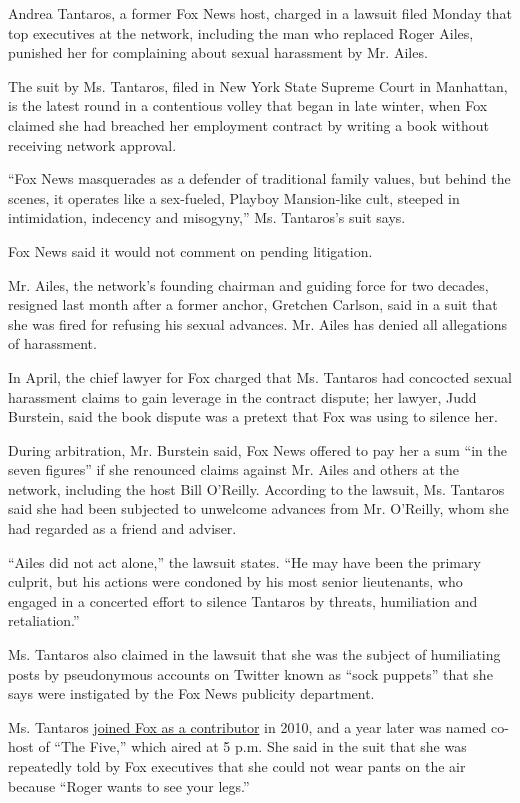 Andrea Tantaros, a former Fox News host, charged in a lawsuit filed
Monday that top executives at the network, including the man who
replaced Roger Ailes, punished her for complaining about sexual
harassment by Mr. Ailes.

The suit by Ms. Tantaros, filed in New York State Supreme Court in
Manhattan, is the latest round in a contentious volley that began in
late winter, when Fox claimed she had breached her employment contract
by writing a book without receiving network approval.

``Fox News masquerades as a defender of traditional family values, but
behind the scenes, it operates like a sex-fueled, Playboy Mansion-like
cult, steeped in intimidation, indecency and misogyny,'' Ms. Tantaros's
suit says.

Fox News said it would not comment on pending litigation.

Mr. Ailes, the network's founding chairman and guiding force for two
decades, resigned last month after a former anchor, Gretchen Carlson,
said in a suit that she was fired for refusing his sexual advances. Mr.
Ailes has denied all allegations of harassment.

In April, the chief lawyer for Fox charged that Ms. Tantaros had
concocted sexual harassment claims to gain leverage in the contract
dispute; her lawyer, Judd Burstein, said the book dispute was a pretext
that Fox was using to silence her.

During arbitration, Mr. Burstein said, Fox News offered to pay her a sum
``in the seven figures'' if she renounced claims against Mr. Ailes and
others at the network, including the host Bill O'Reilly. According to
the lawsuit, Ms. Tantaros said she had been subjected to unwelcome
advances from Mr. O'Reilly, whom she had regarded as a friend and
adviser.

``Ailes did not act alone,'' the lawsuit states. ``He may have been the
primary culprit, but his actions were condoned by his most senior
lieutenants, who engaged in a concerted effort to silence Tantaros by
threats, humiliation and retaliation.''

Ms. Tantaros also claimed in the lawsuit that she was the subject of
humiliating posts by pseudonymous accounts on Twitter known as ``sock
puppets'' that she says were instigated by the Fox News publicity
department.

Ms. Tantaros
\href{http://www.foxnews.com/person/t/andrea-tantaros.html}{joined Fox
as a contributor} in 2010, and a year later was named co-host of ``The
Five,'' which aired at 5 p.m. She said in the suit that she was
repeatedly told by Fox executives that she could not wear pants on the
air because ``Roger wants to see your legs.''

